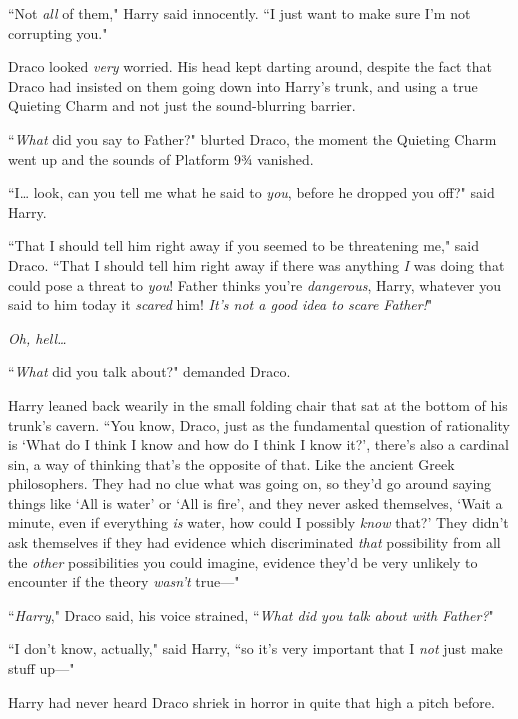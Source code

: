 ``Not \emph{all} of them," Harry said innocently. ``I just want to make sure I'm not corrupting you."

\later

Draco looked \emph{very} worried. His head kept darting around, despite the fact that Draco had insisted on them going down into Harry's trunk, and using a true Quieting Charm and not just the sound-blurring barrier.

``\emph{What} did you say to Father?" blurted Draco, the moment the Quieting Charm went up and the sounds of Platform 9¾ vanished.

``I{\ldots} look, can you tell me what he said to \emph{you}, before he dropped you off?" said Harry.

``That I should tell him right away if you seemed to be threatening me," said Draco. ``That I should tell him right away if there was anything \emph{I} was doing that could pose a threat to \emph{you}! Father thinks you're \emph{dangerous}, Harry, whatever you said to him today it \emph{scared} him! \emph{It's not a good idea to scare Father!}"

\emph{Oh, hell{\ldots}}

``\emph{What} did you talk about?" demanded Draco.

Harry leaned back wearily in the small folding chair that sat at the bottom of his trunk's cavern. ``You know, Draco, just as the fundamental question of rationality is `What do I think I know and how do I think I know it?', there's also a cardinal sin, a way of thinking that's the opposite of that. Like the ancient Greek philosophers. They had no clue what was going on, so they'd go around saying things like `All is water' or `All is fire', and they never asked themselves, `Wait a minute, even if everything \emph{is} water, how could I possibly \emph{know} that?' They didn't ask themselves if they had evidence which discriminated \emph{that} possibility from all the \emph{other} possibilities you could imagine, evidence they'd be very unlikely to encounter if the theory \emph{wasn't} true—"

``\emph{Harry}," Draco said, his voice strained, ``\emph{What did you talk about with Father?}"

``I don't know, actually," said Harry, ``so it's very important that I \emph{not} just make stuff up—"

Harry had never heard Draco shriek in horror in quite that high a pitch before.

